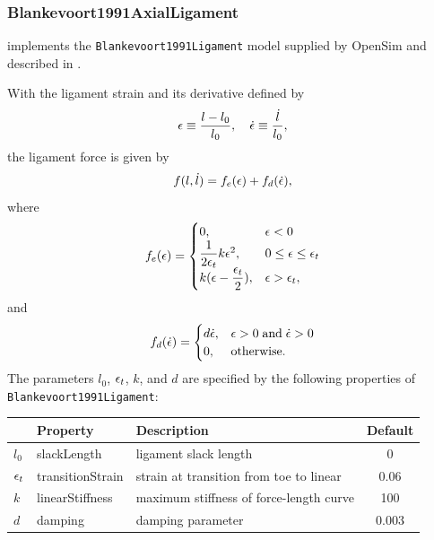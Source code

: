 \subsubsection{Blankevoort1991AxialLigament}

implements the {\tt Blankevoort1991Ligament} model supplied
by OpenSim \cite{delp2007opensim} and described in
\cite{blankevoort1991ligament,smith2016influence}.

With the ligament strain and its derivative defined by
%
\begin{equation}
\epsilon \equiv \frac{l-l_0}{l_0}, \quad \dot{\epsilon} \equiv \frac{\dot l}{l_0},
\end{equation}
%
the ligament force is given by
%
\begin{equation}
f(l,\dot l) = f_e(\epsilon) + f_d(\dot {\epsilon}),
\end{equation}
%
where
%
\begin{equation*}
f_e(\epsilon) = 
\begin{cases}
0, & \epsilon < 0 \\
\dfrac{1}{2 \epsilon_t} k \epsilon^2, & 0 \le \epsilon \le \epsilon_t\\
k(\epsilon - \dfrac{\epsilon_t}{2}), & \epsilon > \epsilon_t,
\end{cases}
\end{equation*}
%
and
%
\begin{equation*}
f_d(\dot{\epsilon}) = 
\begin{cases}
d \dot{\epsilon},  & \epsilon > 0 \; \mathrm{and} \; \dot{\epsilon} > 0 \\
0, & \mathrm{otherwise}.
\end{cases}
\end{equation*}
%
The parameters $l_0$, $\epsilon_t$, $k$, and $d$ are specified by the following
properties of {\tt Blankevoort1991Ligament}:

\begin{center}
\begin{tabular}{|l|l|l|c|} 
\hline
& Property & Description & Default\\
\hline
$l_0$ & {\sf slackLength} &
ligament slack length & 0 \\
$\epsilon_t$ & {\sf transitionStrain} & 
strain at transition from toe to linear & 0.06 \\
$k$ & {\sf linearStiffness} & 
maximum stiffness of force-length curve & 100 \\
$d$ & {\sf damping} & 
damping parameter & 0.003 \\
\hline
\end{tabular}
\end{center}

